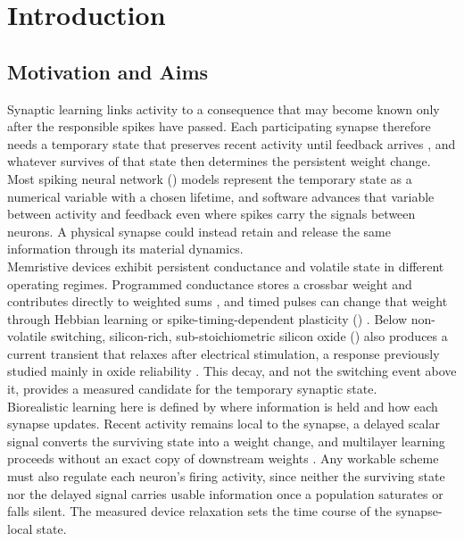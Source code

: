 
\chapter{Introduction}\label{ch:introduction}  %

\section[Motivation and Aims]{Motivation and Aims}

\noindent Synaptic learning links activity to a consequence that may become known only after the responsible
spikes have passed. Each participating synapse therefore needs a temporary state that preserves recent activity
until feedback arrives \cite{izhikevich2007solving}, and whatever survives of that state then determines the
persistent weight change. Most spiking neural network () models represent the temporary state as
a numerical variable with a chosen lifetime, and software advances that variable between activity and feedback
even where spikes carry the signals between neurons. A physical synapse could instead retain and release the
same information through its material dynamics.\\

\noindent Memristive devices exhibit persistent conductance and volatile state in different operating regimes.
Programmed conductance stores a crossbar weight and contributes directly to weighted sums
\cite{von1993first, saighi2015plasticity}, and timed pulses can change that weight through Hebbian learning
\cite{hebb2005organization} or spike-timing-dependent plasticity ()
\cite{markram1997regulation}. Below non-volatile switching, silicon-rich, sub-stoichiometric silicon oxide
() also produces a current transient that relaxes after electrical stimulation, a response
previously studied mainly in oxide reliability \cite{ghibaudo1999emerging, saha2001transient}. This decay, and
not the switching event above it, provides a measured candidate for the temporary synaptic state.\\

\noindent Biorealistic learning here is defined by where information is held and how each synapse updates.
Recent activity remains local to the synapse, a delayed scalar signal converts the surviving state into a
weight change, and multilayer learning proceeds without an exact copy of downstream weights
\cite{grossberg1987competitive, lillicrap2016random}. Any workable scheme must also regulate each neuron's
firing activity, since neither the surviving state nor the delayed signal carries usable information once a
population saturates or falls silent. The measured device relaxation sets the time course of the
synapse-local state.\\

